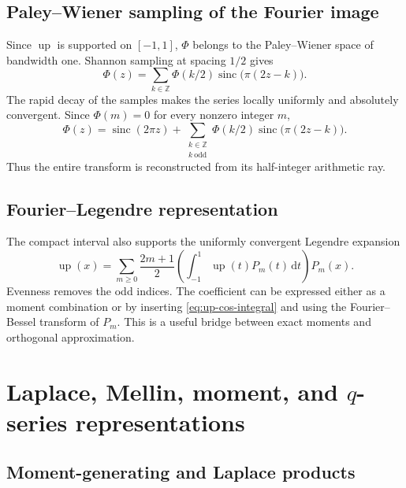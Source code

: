\documentclass[11pt,oneside]{article}
\theoremstyle{definition}
\theoremstyle{remark}
\newcommand{\Z}{\mathbb Z}
\newcommand{\Up}{\operatorname{up}}
\newcommand{\sinc}{\operatorname{sinc}}
\newcommand{\dd}{\,\mathrm d}
\begin{document}
\subsection{Paley--Wiener sampling of the Fourier image}

Since $\Up$ is supported on $[-1,1]$, $\Phi$ belongs to the Paley--Wiener space of bandwidth
one.  Shannon sampling at spacing $1/2$ gives
\begin{equation}
 \Phi(z)=\sum_{k\in\Z}\Phi(k/2)
 \sinc\bigl(\pi(2z-k)\bigr).                             \label{eq:Phi-Shannon}
\end{equation}
The rapid decay of the samples makes the series locally uniformly and absolutely
convergent.  Since $\Phi(m)=0$ for every nonzero integer $m$,
\begin{equation}
 \Phi(z)=\sinc(2\pi z)+
 \sum_{\substack{k\in\Z\\k\ \mathrm{odd}}}
 \Phi(k/2)\sinc\bigl(\pi(2z-k)\bigr).                   \label{eq:Phi-Shannon-odd}
\end{equation}
Thus the entire transform is reconstructed from its half-integer arithmetic ray.

\subsection{Fourier--Legendre representation}

The compact interval also supports the uniformly convergent Legendre expansion
\begin{equation}
 \Up(x)=\sum_{m\ge0}\frac{2m+1}{2}
 \left(\int_{-1}^1\Up(t)P_m(t)\dd t\right)P_m(x).        \label{eq:Legendre}
\end{equation}
Evenness removes the odd indices.  The coefficient can be expressed either as a moment
combination or by inserting \eqref{eq:up-cos-integral} and using the Fourier--Bessel transform
of $P_m$.  This is a useful bridge between exact moments and orthogonal approximation.

\section{Laplace, Mellin, moment, and \texorpdfstring{$q$}{q}-series representations}
\label{sec:laplace-moments}

\subsection{Moment-generating and Laplace products}
\end{document}
